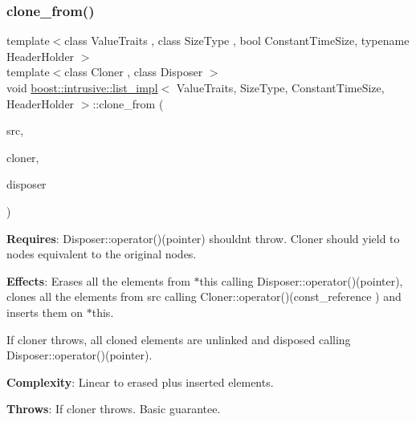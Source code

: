 \subsubsection{\texorpdfstring{clone\+\_\+from()}{clone\_from()}\hspace{0.1cm}{\footnotesize\ttfamily [1/2]}}
{\footnotesize\ttfamily template$<$class Value\+Traits , class Size\+Type , bool Constant\+Time\+Size, typename Header\+Holder $>$ \\
template$<$class Cloner , class Disposer $>$ \\
void \hyperlink{classboost_1_1intrusive_1_1list__impl}{boost\+::intrusive\+::list\+\_\+impl}$<$ Value\+Traits, Size\+Type, Constant\+Time\+Size, Header\+Holder $>$\+::clone\+\_\+from (\begin{DoxyParamCaption}\item[{const \hyperlink{classboost_1_1intrusive_1_1list__impl}{list\+\_\+impl}$<$ Value\+Traits, Size\+Type, Constant\+Time\+Size, Header\+Holder $>$ \&}]{src,  }\item[{Cloner}]{cloner,  }\item[{Disposer}]{disposer }\end{DoxyParamCaption})\hspace{0.3cm}{\ttfamily [inline]}}

{\bfseries Requires}\+: Disposer\+::operator()(pointer) shouldn\textquotesingle{}t throw. Cloner should yield to nodes equivalent to the original nodes.

{\bfseries Effects}\+: Erases all the elements from $\ast$this calling Disposer\+::operator()(pointer), clones all the elements from src calling Cloner\+::operator()(const\+\_\+reference ) and inserts them on $\ast$this.

If cloner throws, all cloned elements are unlinked and disposed calling Disposer\+::operator()(pointer).

{\bfseries Complexity}\+: Linear to erased plus inserted elements.

{\bfseries Throws}\+: If cloner throws. Basic guarantee. \mbox{\label{classboost_1_1intrusive_1_1list__impl_af384af26bd41d2eeecdd6fd718435888}} 
